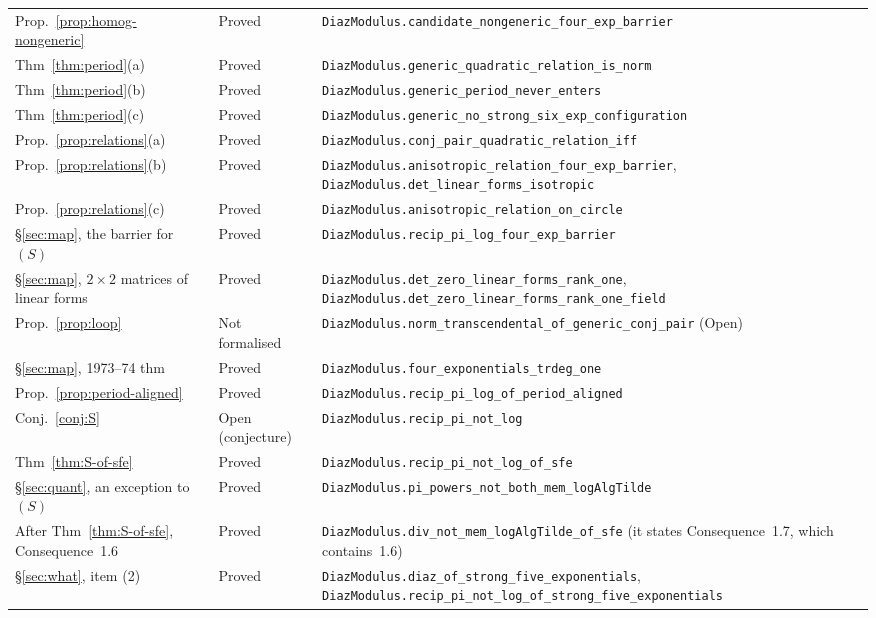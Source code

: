 \documentclass[11pt,a4paper]{article}
\theoremstyle{plain}
\theoremstyle{definition}
\begin{document}
\begin{center}
\begin{longtable}{@{}llp{6.2cm}@{}}
Prop.~\ref{prop:homog-nongeneric} & Proved & \nolinkurl{DiazModulus.candidate_nongeneric_four_exp_barrier} \\
Thm~\ref{thm:period}(a) & Proved & \nolinkurl{DiazModulus.generic_quadratic_relation_is_norm} \\
Thm~\ref{thm:period}(b) & Proved & \nolinkurl{DiazModulus.generic_period_never_enters} \\
Thm~\ref{thm:period}(c) & Proved & \nolinkurl{DiazModulus.generic_no_strong_six_exp_configuration} \\
Prop.~\ref{prop:relations}(a) & Proved & \nolinkurl{DiazModulus.conj_pair_quadratic_relation_iff} \\
Prop.~\ref{prop:relations}(b) & Proved & \nolinkurl{DiazModulus.anisotropic_relation_four_exp_barrier}, \nolinkurl{DiazModulus.det_linear_forms_isotropic} \\
Prop.~\ref{prop:relations}(c) & Proved & \nolinkurl{DiazModulus.anisotropic_relation_on_circle} \\
\S\ref{sec:map}, the barrier for $(S)$ & Proved & \nolinkurl{DiazModulus.recip_pi_log_four_exp_barrier} \\
\S\ref{sec:map}, $2\times2$ matrices of linear forms & Proved & \nolinkurl{DiazModulus.det_zero_linear_forms_rank_one}, \nolinkurl{DiazModulus.det_zero_linear_forms_rank_one_field} \\
Prop.~\ref{prop:loop} & Not formalised & \nolinkurl{DiazModulus.norm_transcendental_of_generic_conj_pair} (Open) \\
\S\ref{sec:map}, 1973--74 thm & Proved & \nolinkurl{DiazModulus.four_exponentials_trdeg_one} \\
Prop.~\ref{prop:period-aligned} & Proved & \nolinkurl{DiazModulus.recip_pi_log_of_period_aligned} \\
Conj.~\ref{conj:S} & Open (conjecture) & \nolinkurl{DiazModulus.recip_pi_not_log} \\
Thm~\ref{thm:S-of-sfe} & Proved & \nolinkurl{DiazModulus.recip_pi_not_log_of_sfe} \\
\S\ref{sec:quant}, an exception to $(S)$ & Proved & \nolinkurl{DiazModulus.pi_powers_not_both_mem_logAlgTilde} \\
After Thm~\ref{thm:S-of-sfe}, Consequence~1.6 & Proved & \nolinkurl{DiazModulus.div_not_mem_logAlgTilde_of_sfe} (it states Consequence~1.7, which contains~1.6) \\
\S\ref{sec:what}, item (2) & Proved & \nolinkurl{DiazModulus.diaz_of_strong_five_exponentials}, \nolinkurl{DiazModulus.recip_pi_not_log_of_strong_five_exponentials} \\

\end{longtable}
\end{center}
\end{document}
